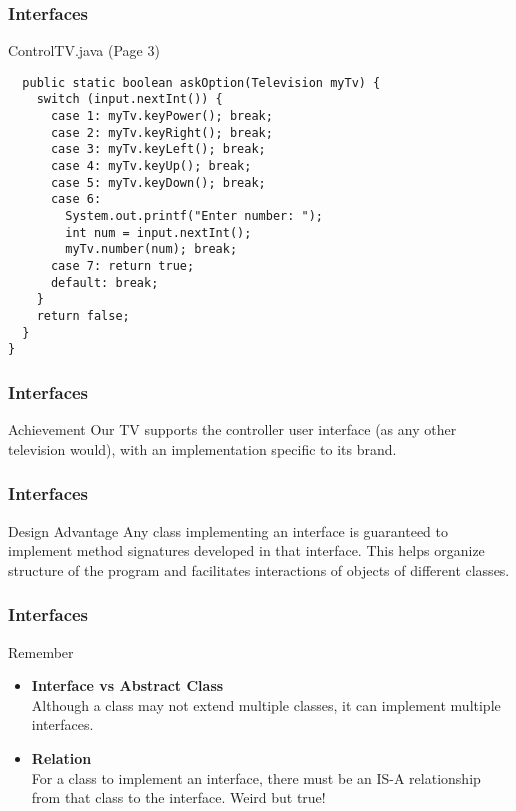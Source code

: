 \documentclass[10pt, compress]{beamer}
\begin{document}
\begin{frame}[fragile]
  \frametitle{Interfaces}
  \begin{block}{ControlTV.java (Page 3)}
    \begin{verbatim}
  public static boolean askOption(Television myTv) {
    switch (input.nextInt()) {
      case 1: myTv.keyPower(); break;
      case 2: myTv.keyRight(); break;
      case 3: myTv.keyLeft(); break;
      case 4: myTv.keyUp(); break;
      case 5: myTv.keyDown(); break;
      case 6:
        System.out.printf("Enter number: ");
        int num = input.nextInt();
        myTv.number(num); break;
      case 7: return true;
      default: break;
    }
    return false;
  }
}
    \end{verbatim}
  \end{block}
\end{frame}

\begin{frame}[fragile]
  \frametitle{Interfaces}
  \begin{block}{Achievement}
    Our TV supports the controller user interface (as any other television would), with an implementation specific to its brand.
  \end{block}
\end{frame}

\begin{frame}[fragile]
  \frametitle{Interfaces}
  \begin{block}{Design Advantage}
    Any class implementing an interface is guaranteed to implement method signatures developed in that interface.
    This helps organize structure of the program and facilitates interactions of objects of different classes.
  \end{block}
\end{frame}

\begin{frame}[fragile]
  \frametitle{Interfaces}
  \begin{block}{Remember}
    \begin{itemize}
      \item[] \textbf{Interface vs Abstract Class}\\
      Although a class may not extend multiple classes, it can implement multiple interfaces.

      \item[] \textbf{Relation}\\
      For a class to implement an interface, there must be an IS-A relationship from that class to the interface. Weird but true!
    \end{itemize}
  \end{block}
\end{frame}

\end{document}

